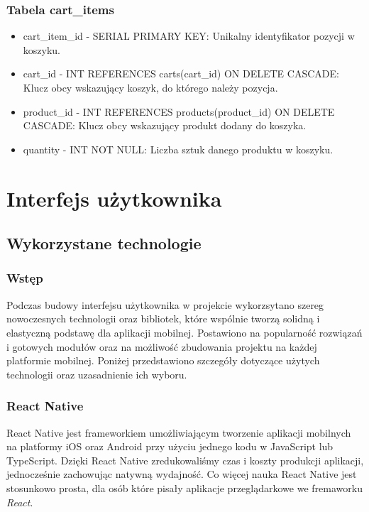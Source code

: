 \subsubsection{Tabela cart\_items}
\begin{itemize}
\item cart\_item\_id - SERIAL PRIMARY KEY: Unikalny identyfikator pozycji w koszyku.
\item cart\_id - INT REFERENCES carts(cart\_id) ON DELETE CASCADE: Klucz obcy wskazujący koszyk, do którego należy pozycja.
\item product\_id - INT REFERENCES products(product\_id) ON DELETE CASCADE: Klucz obcy wskazujący produkt dodany do koszyka.
\item quantity - INT NOT NULL: Liczba sztuk danego produktu w koszyku.
\end{itemize}

\section{Interfejs użytkownika}

\subsection{Wykorzystane technologie}

\subsubsection{Wstęp}

Podczas budowy interfejsu użytkownika w projekcie wykorzsytano szereg nowoczesnych technologii oraz bibliotek, które wspólnie tworzą solidną i elastyczną podstawę dla aplikacji mobilnej. Postawiono na popularność rozwiązań i gotowych modułów oraz na możliwość zbudowania projektu na każdej platformie mobilnej. Poniżej przedstawiono szczegóły dotyczące użytych technologii oraz uzasadnienie ich wyboru.

\subsubsection{React Native}

React Native jest frameworkiem umożliwiającym tworzenie aplikacji mobilnych na platformy iOS oraz Android przy użyciu jednego kodu w JavaScript lub TypeScript. Dzięki React Native zredukowaliśmy czas i koszty produkcji aplikacji, jednocześnie zachowując natywną wydajność. Co więcej nauka React Native jest stosunkowo prosta, dla osób które pisały aplikacje przeglądarkowe we fremaworku \textit{React}.

